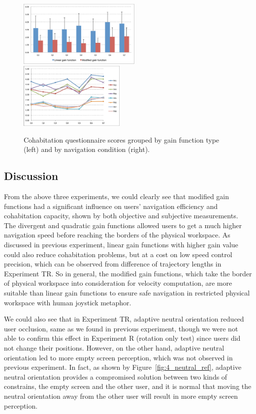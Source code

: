 \begin{figure}[tb]
  \centering
  \includegraphics[width=0.53\textwidth]{figures/ch4/qn_bar}
  \includegraphics[width=0.46\textwidth]{figures/ch4/qn_line}
  \caption{\label{fig:4_questionnaire}Cohabitation questionnaire scores grouped by gain function type (left) and by navigation condition (right).}
\end{figure}

\subsection{Discussion}
From the above three experiments, we could clearly see that modified gain functions had a significant influence on users' navigation efficiency and cohabitation capacity, shown by both objective and subjective measurements. The divergent and quadratic gain functions allowed users to get a much higher navigation speed before reaching the borders of the physical workspace. As discussed in previous experiment, linear gain functions with higher gain value could also reduce cohabitation problems, but at a cost on low speed control precision, which can be observed from difference of trajectory lengths in Experiment TR. So in general, the modified gain functions, which take the border of physical workspace into consideration for velocity computation, are more suitable than linear gain functions to ensure safe navigation in restricted physical workspace with human joystick metaphor.

We could also see that in Experiment TR, adaptive neutral orientation reduced user occlusion, same as we found in previous experiment, though we were not able to confirm this effect in Experiment R (rotation only test) since users did not change their positions. However, on the other hand, adaptive neutral orientation led to more empty screen perception, which was not observed in previous experiment. In fact, as shown by Figure~\ref{fig:4_neutral_ref}, adaptive neutral orientation provides a compromised solution between two kinds of constrains, the empty screen and the other user, and it is normal that moving the neutral orientation away from the other user will result in more empty screen perception.

